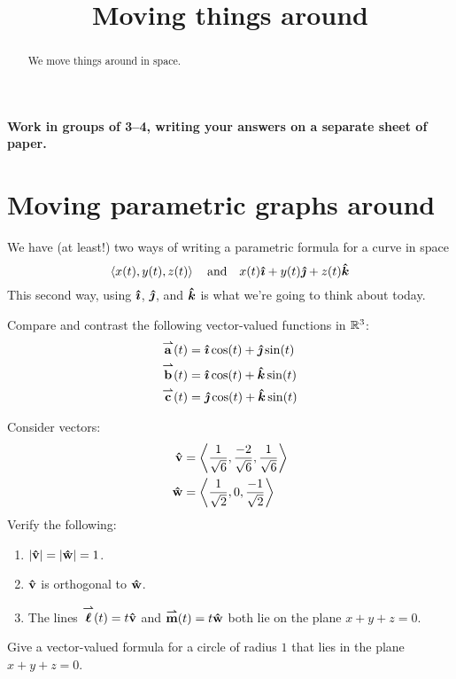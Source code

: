 \documentclass[handout,hints,noauthor,nooutcomes]{ximera}
\title[Collaborate:]{Moving things around}
\begin{document}
\begin{abstract}
  We move things around in space.
\end{abstract}
\maketitle

\textbf{Work in groups of 3--4, writing your answers on a separate
  sheet of paper.}


\section{Moving parametric graphs around}

We have (at least!) two ways of writing a parametric formula for a
curve in space
\[
\left\langle x(t),y(t),z(t)\right\rangle\quad\text{and}\quad x(t) {\boldsymbol{\hat{\imath}}} + y(t) {\boldsymbol{\hat{\jmath}}} + z(t) {\boldsymbol{\hat{k}}}
\]
This second way, using ${\boldsymbol{\hat{\imath}}}$, ${\boldsymbol{\hat{\jmath}}}$, and ${\boldsymbol{\hat{k}}}$ is what we're
going to think about today.

\begin{problem}
  Compare and contrast the following vector-valued functions in
  $\mathbb R^3$:
  \begin{align*}
    {\overset{\boldsymbol{\rightharpoonup}}{\mathbf{a}}}(t) &= {\boldsymbol{\hat{\imath}}} \cos(t) + {\boldsymbol{\hat{\jmath}}} \sin(t)\\
    {\overset{\boldsymbol{\rightharpoonup}}{\mathbf{b}}}(t) &= {\boldsymbol{\hat{\imath}}} \cos(t) + {\boldsymbol{\hat{k}}} \sin(t)\\
    {\overset{\boldsymbol{\rightharpoonup}}{\mathbf{c}}}(t) &= {\boldsymbol{\hat{\jmath}}} \cos(t) + {\boldsymbol{\hat{k}}} \sin(t)
  \end{align*}
\end{problem}

\begin{problem}
  Consider vectors:
  \begin{align*}
    \mathbf{\hat{v}} &= \left\langle \frac{1}{\sqrt{6}},\frac{-2}{\sqrt{6}},\frac{1}{\sqrt{6}}\right\rangle\\
    \mathbf{\hat{w}} &= \left\langle \frac{1}{\sqrt{2}},0,\frac{-1}{\sqrt{2}}\right\rangle
  \end{align*}
  Verify the following:
  \begin{enumerate}
  \item $|\mathbf{\hat{v}}| = |\mathbf{\hat{w}}| = 1$.
  \item $\mathbf{\hat{v}}$ is orthogonal to $\mathbf{\hat{w}}$.
  \item The lines ${\overset{\boldsymbol{\rightharpoonup}}{\mathbf{\boldsymbol{\ell}}}}(t) = t \mathbf{\hat{v}}$ and ${\overset{\boldsymbol{\rightharpoonup}}{\mathbf{m}}}(t) = t
    \mathbf{\hat{w}}$ both lie on the plane $x+y+z = 0$.
  \end{enumerate}
\end{problem}

\begin{problem}
  Give a vector-valued formula for a circle of radius $1$ that lies in
  the plane $x+y+z=0$.
\end{problem}
\end{document}
